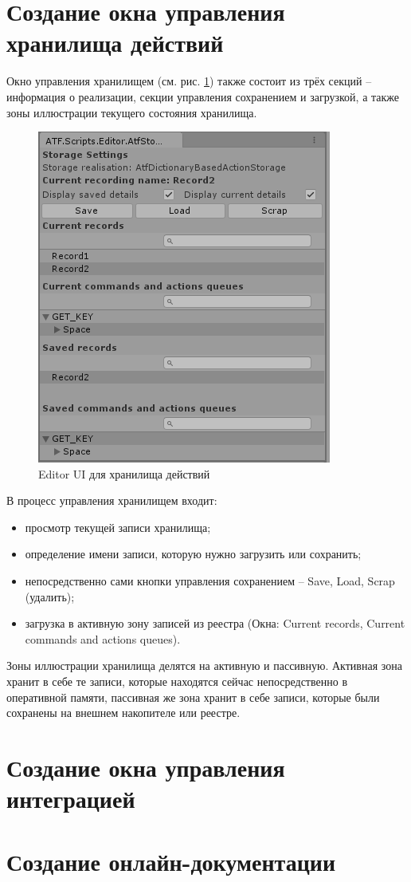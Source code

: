 \section{Создание окна управления хранилища действий}
Окно управления хранилищем (см. рис. \ref{storageUI}) также состоит из трёх секций -- информация о реализации, секции управления сохранением и загрузкой, а также зоны иллюстрации текущего состояния хранилища.

\begin{figure}[h]
	\centering
	\includegraphics[width=0.7\linewidth]{storage.PNG}
	\caption{Editor UI для хранилища действий}
	\label{storageUI}
\end{figure}

В процесс управления хранилищем входит:
\begin{itemize}
	\item
	просмотр текущей записи хранилища;
	\item
	определение имени записи, которую нужно загрузить или сохранить; 
	\item
	непосредственно сами кнопки управления сохранением -- Save, Load, Scrap (удалить);
	\item
	загрузка в активную зону записей из реестра (Окна: Current records, Current commands and actions queues).
\end{itemize}
Зоны иллюстрации хранилища делятся на активную и пассивную. Активная зона хранит в себе те записи, которые находятся сейчас непосредственно в оперативной памяти, пассивная же зона хранит в себе записи, которые были сохранены на внешнем накопителе или реестре.

\section{Создание окна управления интеграцией}

\section{Создание онлайн-документации}